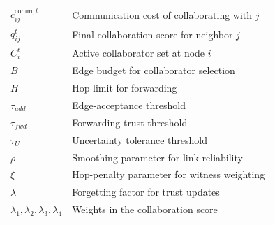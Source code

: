 \documentclass[journal]{IEEEtran}
\theoremstyle{definition}
\theoremstyle{remark}
\begin{document}
\begin{table}[t]
\begin{tabular}{ll}
$c_{ij}^{\text{comm},t}$ & Communication cost of collaborating with $j$ \\
$q_{ij}^t$ & Final collaboration score for neighbor $j$ \\
$C_i^t$ & Active collaborator set at node $i$ \\
$B$ & Edge budget for collaborator selection \\
$H$ & Hop limit for forwarding \\
$\tau_{add}$ & Edge-acceptance threshold \\
$\tau_{fwd}$ & Forwarding trust threshold \\
$\tau_U$ & Uncertainty tolerance threshold \\
$\rho$ & Smoothing parameter for link reliability \\
$\xi$ & Hop-penalty parameter for witness weighting \\
$\lambda$ & Forgetting factor for trust updates \\
$\lambda_1,\lambda_2,\lambda_3,\lambda_4$ & Weights in the collaboration score \\
\bottomrule
\end{tabular}
\end{table}
\end{document}
